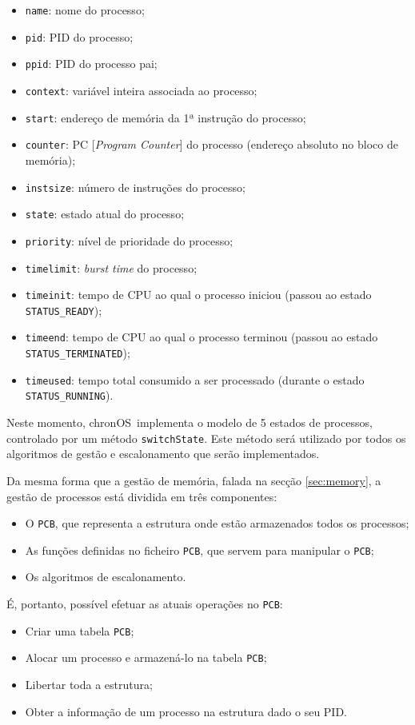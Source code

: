 \documentclass[a4paper,11pt,onecolumn,oneside]{article}
\newcommand{\chronOS}{\textsf{chronOS}}
\begin{document}
	\begin{itemize}
		\item \verb|name|: nome do processo;
		\item \verb|pid|: PID do processo;
		\item \verb|ppid|: PID do processo pai;
		\item \verb|context|: variável inteira associada ao processo;
		\item \verb|start|: endereço de memória da 1ª instrução do processo;
		\item \verb|counter|: PC [\textit{Program Counter}] do processo (endereço absoluto no bloco de memória);
		\item \verb|instsize|: número de instruções do processo;
		\item \verb|state|: estado atual do processo;
		\item \verb|priority|: nível de prioridade do processo;
		\item \verb|timelimit|: \textit{burst time} do processo;
		\item \verb|timeinit|: tempo de CPU ao qual o processo iniciou (passou ao estado \texttt{STATUS\_READY});
		\item \verb|timeend|: tempo de CPU ao qual o processo terminou (passou ao estado \texttt{STATUS\_TERMINATED});
		\item \verb|timeused|: tempo total consumido a ser processado (durante o estado \texttt{STATUS\_RUNNING}).
	\end{itemize}
	
	Neste momento, \chronOS~implementa o modelo de 5 estados de processos, controlado por um método \verb|switchState|. Este método será utilizado por todos os algoritmos de gestão e escalonamento que serão implementados.
	
	Da mesma forma que a gestão de memória, falada na secção \ref{sec:memory}, a gestão de processos está dividida em três componentes:
	
	\begin{itemize} %
	    \item O \texttt{\ac{PCB}}, que representa a estrutura onde estão armazenados todos os processos;
	    \item As funções definidas no ficheiro \texttt{\ac{PCB}}, que servem para manipular o \texttt{\ac{PCB}};
	    \item Os algoritmos de escalonamento.
	\end{itemize}  
	
	É, portanto, possível efetuar as atuais operações no \verb|PCB|:
	\begin{itemize}
	    \item Criar uma tabela \verb|PCB|;
	    \item Alocar um processo e armazená-lo na tabela \verb|PCB|;
	    \item Libertar toda a estrutura;
	    \item Obter a informação de um processo na estrutura dado o seu PID.
	\end{itemize}
	
\end{document}
